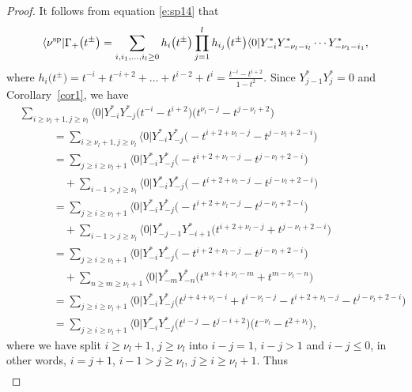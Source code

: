 \documentclass[10pt,a4paper]{amsart}
\numberwithin{equation}{section}
\begin{document}
\begin{proof}It follows from equation \eqref{e:sp14} that
\begin{align}\label{e:sp10}
\langle\nu^{\rm sp}|\Gamma_+\big(t^{\pm}\big)
=\sum_{i,i_1,\dots,i_l\geq 0}h_i\big(t^{\pm}\big)\prod^l_{j=1}h_{i_j}\big(t^{\pm}\big)\langle 0|Y^*_{-i}Y^*_{-\nu_l-i_l}\cdots Y^*_{-\nu_1-i_1},
\end{align}
where $h_i\big(t^{\pm}\big)=t^{-i}+t^{-i+2}+\dots+t^{i-2}+t^i=\frac{t^{-i}-t^{i+2}}{1-t^2}$.
Since $Y^*_{j-1}Y^*_{j}=0$ and Corollary~\ref{cor1}, we have
\begin{align*}
&\sum_{i\geq \nu_l+1,j\geq \nu_l}\langle 0|Y^*_{-i}Y^*_{-j}\bigl(t^{-i}-t^{i+2}\bigr)\bigl(t^{\nu_l-j}-t^{j-\nu_l+2}\bigr)\\
&\qquad\quad{}=\sum_{i\geq \nu_l+1,j\geq \nu_l}\langle 0|Y^*_{-i}Y^*_{-j}\bigl(-t^{i+2+\nu_l-j}-t^{j-\nu_l+2-i}\bigr)\\
&\qquad\quad{}=\sum_{j\geq i\geq \nu_l+1}\langle 0|Y^*_{-i}Y^*_{-j}\bigl(-t^{i+2+\nu_l-j}-t^{j-\nu_l+2-i}\bigr)\\
&\qquad\qquad{}+\sum_{i-1> j\geq\nu_l}\langle 0|Y^*_{-i}Y^*_{-j}\bigl(-t^{i+2+\nu_l-j}-t^{j-\nu_l+2-i}\bigr)\\
&\qquad\quad{}=\sum_{j\geq i\geq \nu_l+1}\langle 0|Y^*_{-i}Y^*_{-j}\bigl(-t^{i+2+\nu_l-j}-t^{j-\nu_l+2-i}\bigr)\\
&\qquad\qquad{}+\sum_{i-1> j\geq\nu_l}\langle 0|Y^*_{-j-1}Y^*_{-i+1}\bigl(t^{i+2+\nu_l-j}+t^{j-\nu_l+2-i}\bigr)\\
&\qquad\quad{}=\sum_{j\geq i\geq \nu_l+1}\langle 0|Y^*_{-i}Y^*_{-j}\bigl(-t^{i+2+\nu_l-j}-t^{j-\nu_l+2-i}\bigr)\\
&\qquad\qquad{}+\sum_{n\geq m\geq \nu_l+1}\langle 0|Y^*_{-m}Y^*_{-n}\bigl(t^{n+4+\nu_l-m}+t^{m-\nu_l-n}\bigr)\\
&\qquad\quad{}=\sum_{j\geq i\geq \nu_l+1}\langle 0|Y^*_{-i}Y^*_{-j}\bigl(t^{j+4+\nu_l-i}+t^{i-\nu_l-j}-t^{i+2+\nu_l-j}-t^{j-\nu_l+2-i}\bigr)\\
&\qquad\quad{}=\sum_{j\geq i\geq \nu_l+1}\langle 0|Y^*_{-i}Y^*_{-j}\bigl(t^{i-j}-t^{j-i+2}\bigr)\bigl(t^{-\nu_l}-t^{2+\nu_l}\bigr),
\end{align*}
where we have split $i\geq \nu_l+1$, $j\geq \nu_l$ into $i-j=1$, $i-j>1$ and $i-j\leq 0$, in other words, $i=j+1$, $i-1> j\geq\nu_l$, $j\geq i\geq \nu_l+1$.
Thus
\begin{align*}

\end{align*}
\end{proof}
\end{document}

